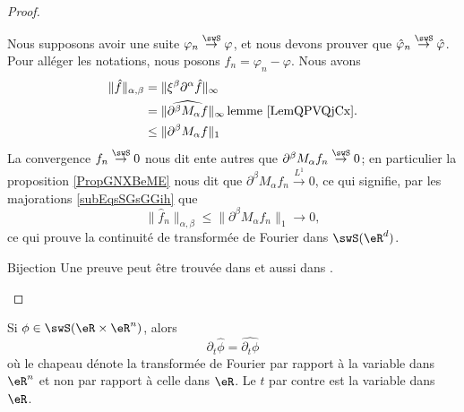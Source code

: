 \begin{proof}
\begin{subproof}
            Nous supposons avoir une suite \( \varphi_n\stackrel{\swS}{\to}\varphi\), et nous devons prouver que \( \hat\varphi_n\stackrel{\swS}{\to}\hat\varphi\). Pour alléger les notations, nous posons \( f_n=\varphi_n-\varphi\). Nous avons
            \begin{subequations}    \label{subEqsSGsGGih}
                \begin{align}
                    \| \hat f \|_{\alpha,\beta}&=\| \xi^{\beta}\partial^{\alpha}\hat f \|_{\infty}\\
                    &=\| \widehat{  \partial^{\beta}M_{\alpha}f  } \|_{\infty}\,\text{lemme \ref{LemQPVQjCx}.}\\
                    &\leq \| \partial^{\beta}M_{\alpha}f \|_1
                \end{align}
            \end{subequations}
            La convergence \(f_n\stackrel{\swS}{\to}0\) nous dit ente autres que \( \partial^{\beta}M_{\alpha}f_n\stackrel{\swS}{\to}0\); en particulier la proposition \ref{PropGNXBeME} nous dit que \( \partial^{\beta}M_{\alpha}f_n\stackrel{L^1}{\to}0\), ce qui signifie, par les majorations \eqref{subEqsSGsGGih} que
            \begin{equation}
                \| \hat f_n \|_{\alpha,\beta}\leq \| \partial^{\beta}M_{\alpha}f_n \|_1\to0,
            \end{equation}
            ce qui prouve la continuité de transformée de Fourier dans \( \swS(\eR^d)\).
        \item[Bijection]
            Une preuve peut être trouvée dans \cite{BMoNzTY} et aussi dans \cite{ThoVDDBnVn}.
    \end{subproof}
\end{proof}

\begin{lemma}
    Si \( \phi\in\swS(\eR\times \eR^n)\), alors
    \begin{equation}
        \partial_t\hat\phi=\widehat{\partial_t\phi}
    \end{equation}
    où le chapeau dénote la transformée de Fourier par rapport à la variable dans \( \eR^n\) et non par rapport à celle dans \( \eR\). Le \( t\) par contre est la variable dans \( \eR\).
\end{lemma}

